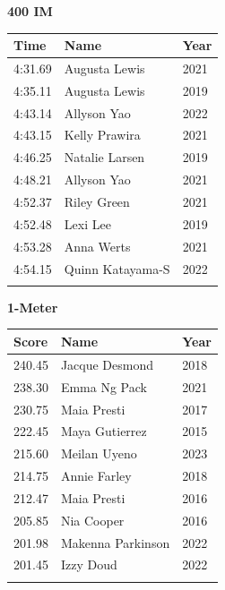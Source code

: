 \vspace{1.2em}
\noindent\begin{minipage}[t]{0.48\textwidth}
\centering
\textbf{\textcolor{teamprimary}{400 IM}}\par
\vspace{0.5em}
\centering
\small
\renewcommand{\arraystretch}{1.0}
\setlength{\tabcolsep}{4pt}
\begin{tabular}{@{}p{1.8cm}p{3.0cm}p{1.0cm}@{}}
\toprule
\textbf{Time} & \textbf{Name} & \textbf{Year} \\
\midrule
4:31.69 & Augusta Lewis & 2021 \\
4:35.11 & Augusta Lewis & 2019 \\
4:43.14 & Allyson Yao & 2022 \\
4:43.15 & Kelly Prawira & 2021 \\
4:46.25 & Natalie Larsen & 2019 \\
4:48.21 & Allyson Yao & 2021 \\
4:52.37 & Riley Green & 2021 \\
4:52.48 & Lexi Lee & 2019 \\
4:53.28 & Anna Werts & 2021 \\
4:54.15 & Quinn Katayama-S & 2022 \\
\bottomrule
\vspace{0.5em}
\end{tabular}
\end{minipage}
\hfill
\begin{minipage}[t]{0.48\textwidth}
\centering
\textbf{\textcolor{teamprimary}{1-Meter}}\par
\vspace{0.5em}
\centering
\small
\renewcommand{\arraystretch}{1.0}
\setlength{\tabcolsep}{4pt}
\begin{tabular}{@{}p{1.8cm}p{3.0cm}p{1.0cm}@{}}
\toprule
\textbf{Score} & \textbf{Name} & \textbf{Year} \\
\midrule
240.45 & Jacque Desmond & 2018 \\
238.30 & Emma Ng Pack & 2021 \\
230.75 & Maia Presti & 2017 \\
222.45 & Maya Gutierrez & 2015 \\
215.60 & Meilan Uyeno & 2023 \\
214.75 & Annie Farley & 2018 \\
212.47 & Maia Presti & 2016 \\
205.85 & Nia Cooper & 2016 \\
201.98 & Makenna Parkinson & 2022 \\
201.45 & Izzy Doud & 2022 \\
\bottomrule
\vspace{0.5em}
\end{tabular}
\end{minipage}
